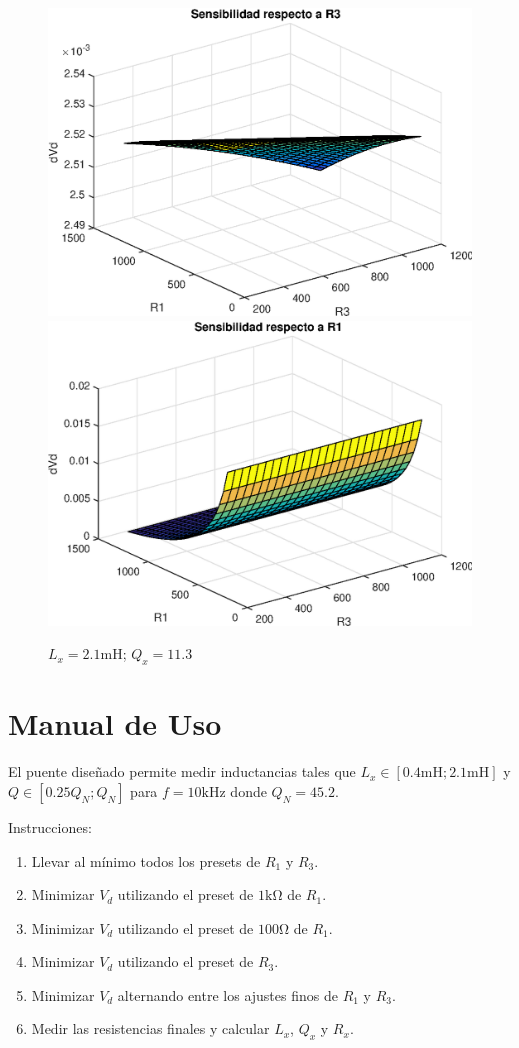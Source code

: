     \begin{figure}[ht!]
        \begin{center}
            \includegraphics[width=0.4\linewidth]{MATLAB/ej3dVd3max}
            \includegraphics[width=0.4\linewidth]{MATLAB/ej3dVd1max}
            \caption{$L_x=2.1\si{\milli\henry}$; $Q_x=11.3$}
            \label{fig:ej3dVd:max}
        \end{center}
    \end{figure}

    \newpage
    \section{Manual de Uso}
    El puente diseñado permite medir inductancias tales que $L_x\in[0.4\si{\milli\henry};
    2.1\si{\milli\henry}]$ y $Q\in[0.25Q_N; Q_N]$ para $f=10\si{\kilo\hertz}$ donde $Q_N=45.2$.
    
    Instrucciones:
    \begin{enumerate}
        \item Llevar al mínimo todos los presets de $R_1$ y $R_3$.
        \item Minimizar $V_d$ utilizando el preset de $1\si{\kilo\ohm}$ de $R_1$.
        \item Minimizar $V_d$ utilizando el preset de $100\si{\ohm}$ de $R_1$.
        \item Minimizar $V_d$ utilizando el preset de $R_3$.
        \item Minimizar $V_d$ alternando entre los ajustes finos de $R_1$ y $R_3$.
        \item Medir las resistencias finales y calcular $L_x$, $Q_x$ y $R_x$.
    \end{enumerate}


